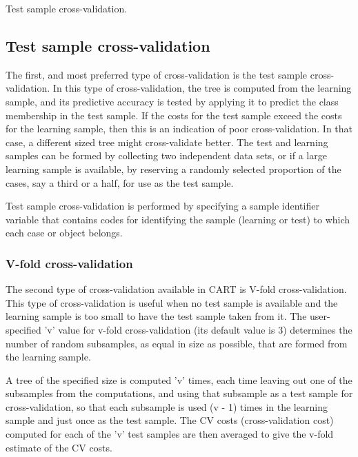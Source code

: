Test sample cross-validation. 

\subsection{Test sample cross-validation}
The first, and most preferred type of cross-validation is the test sample cross-validation. In this type of cross-validation, the tree is computed from the learning sample, and its predictive accuracy is tested by applying it to predict the class membership in the test sample. If the costs for the test sample exceed the costs for the learning sample, then this is an indication of poor cross-validation. In that case, a different sized tree might cross-validate better. The test and learning samples can be formed by collecting two independent data sets, or if a large learning sample is available, by reserving a randomly selected proportion of the cases, say a third or a half, for use as the test sample.

Test sample cross-validation is performed by specifying a sample identifier variable that contains codes for identifying the sample (learning or test) to which each case or object belongs.


\subsubsection{V-fold cross-validation} 
The second type of cross-validation available in CART is V-fold cross-validation. This type of cross-validation is useful when no test sample is available and the learning sample is too small to have the test sample taken from it. The user-specified 'v' value for v-fold cross-validation (its default value is 3) determines the number of random subsamples, as equal in size as possible, that are formed from the learning sample. 

A tree of the specified size is computed 'v' times, each time leaving out one of the subsamples from the computations, and using that subsample as a test sample for cross-validation, so that each subsample is used (v - 1) times in the learning sample and just once as the test sample. The CV costs (cross-validation cost) computed for each of the 'v' test samples are then averaged to give the v-fold estimate of the CV costs.

